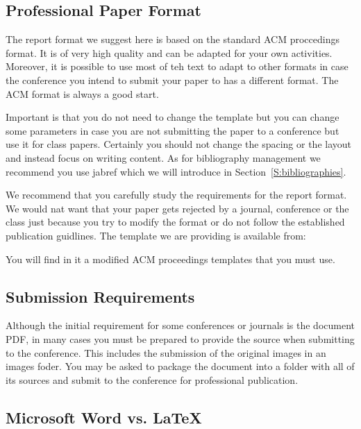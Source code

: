 \subsection{Professional Paper Format}\label{professional-paper-format}

The report format we suggest here is based on the standard ACM
proccedings format. It is of very high quality and can be adapted for
your own activities. Moreover, it is possible to use most of teh text to
adapt to other formats in case the conference you intend to submit your
paper to has a different format. The ACM format is always a good start.

Important is that you do not need to change the template but you can
change some parameters in case you are not submitting the paper to a
conference but use it for class papers. Certainly you should not change
the spacing or the layout and instead focus on writing content. As for
bibliography management we recommend you use jabref which we will
introduce in Section~\ref{S:bibliographies}.

We recommend that you carefully study the requirements for the report
format. We would nat want that your paper gets rejected by a journal,
conference or the class just because you try to modify the format or
do not follow the established publication guidlines. The template we
are providing is available from:


You will find in it a modified ACM proceedings templates that you must
use. 

\subsection{Submission Requirements}\label{submission-requirements}

Although the initial requirement for some conferences or journals is the
document PDF, in many cases you must be prepared to provide the source
when submitting to the conference. This includes the submission of the
original images in an images foder. You may be asked to package the
document into a folder with all of its sources and submit to the
conference for professional publication.

\subsection{Microsoft Word vs. \LaTeX}\label{microsoft-word}

